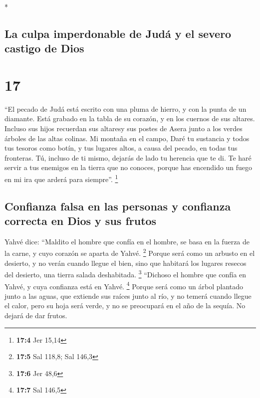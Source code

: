 \begin{paracol}{2}
\begin{otherlanguage}{english}
\end{otherlanguage}

\switchcolumn[0]*

\hypertarget{la-culpa-imperdonable-de-juduxe1-y-el-severo-castigo-de-dios}{%
\subsection{La culpa imperdonable de Judá y el severo castigo de
Dios}\label{la-culpa-imperdonable-de-juduxe1-y-el-severo-castigo-de-dios}}

\hypertarget{section-32}{%
\section{17}\label{section-32}}

 ``El pecado de Judá está escrito con una pluma de hierro,
y con la punta de un diamante. Está grabado en la tabla de su corazón, y
en los cuernos de sus altares.  Incluso sus hijos
recuerdan sus altaresy sus postes de Asera junto a los verdes árboles de
las altas colinas.  Mi montaña en el campo, Daré tu
sustancia y todos tus tesoros como botín, y tus lugares altos, a causa
del pecado, en todas tus fronteras.  Tú, incluso de ti
mismo, dejarás de lado tu herencia que te di. Te haré servir a tus
enemigos en la tierra que no conoces, porque has encendido un fuego en
mi ira que arderá para siempre''. \footnote{\textbf{17:4} Jer 15,14}

\hypertarget{confianza-falsa-en-las-personas-y-confianza-correcta-en-dios-y-sus-frutos}{%
\subsection{Confianza falsa en las personas y confianza correcta en Dios
y sus
frutos}\label{confianza-falsa-en-las-personas-y-confianza-correcta-en-dios-y-sus-frutos}}

 Yahvé dice: ``Maldito el hombre que confía en el hombre,
se basa en la fuerza de la carne, y cuyo corazón se aparta de Yahvé.
\footnote{\textbf{17:5} Sal 118,8; Sal 146,3}  Porque será
como un arbusto en el desierto, y no verán cuando llegue el bien, sino
que habitará los lugares resecos del desierto, una tierra salada
deshabitada. \footnote{\textbf{17:6} Jer 48,6}  ``Dichoso
el hombre que confía en Yahvé, y cuya confianza está en Yahvé.
\footnote{\textbf{17:7} Sal 146,5}  Porque será como un
árbol plantado junto a las aguas, que extiende sus raíces junto al río,
y no temerá cuando llegue el calor, pero su hoja será verde, y no se
preocupará en el año de la sequía. No dejará de dar frutos.


\end{paracol}
